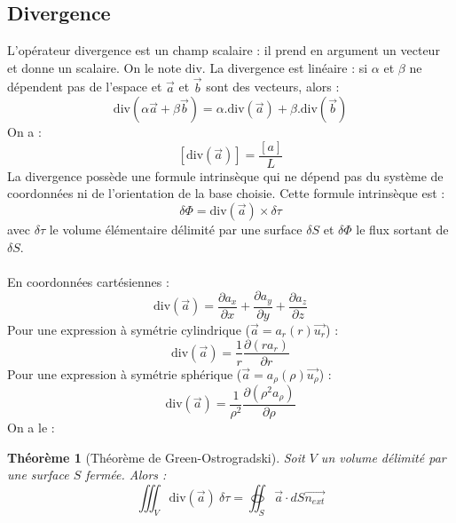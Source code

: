 \documentclass[french]{book}
\theoremstyle{plain}
\newtheorem{thm}{Théorème}
\theoremstyle{definition}
\theoremstyle{remark}
\renewcommand{\div}{\text{div}}
\begin{document}
\subsection{Divergence}
L'opérateur divergence est un champ scalaire : il prend en argument un vecteur et donne un scalaire. On le note $\div$. La divergence est linéaire : si $\alpha$ et $\beta$ ne dépendent pas de l'espace et $\overrightarrow{a}$ et $\overrightarrow{b}$ sont des vecteurs, alors : $$\div(\alpha \overrightarrow{a}+\beta\overrightarrow{b})=\alpha.\div(\overrightarrow{a})+\beta.\div(\overrightarrow{b})$$
On a : $$\left[\div(\overrightarrow{a})\right]=\frac{[a]}{L}$$ 
La divergence possède une formule intrinsèque qui ne dépend pas du système de coordonnées ni de l'orientation de la base choisie. Cette formule intrinsèque est : $$\delta\Phi =\div(\overrightarrow{a})\times\delta\tau$$ avec $\delta\tau$ le volume élémentaire délimité par une surface $\delta S$ et $\delta\Phi$ le flux sortant de $\delta S$. \\ \\
En coordonnées cartésiennes : $$\div(\overrightarrow{a})=\frac{\partial a_x}{\partial x}+\frac{\partial a_y}{\partial y}+\frac{\partial a_z}{\partial z}$$
Pour une expression à symétrie cylindrique ($\overrightarrow{a}=a_r(r)\overrightarrow{u_r}$) : $$\div(\overrightarrow{a})=\frac{1}{r}\frac{\partial(ra_r)}{\partial r}$$
Pour une expression à symétrie sphérique ($\overrightarrow{a}=a_\rho(\rho)\overrightarrow{u_\rho}$) : $$\div(\overrightarrow{a})=\frac{1}{\rho^2}\frac{\partial(\rho^2a_\rho)}{\partial \rho}$$
On a le :
\begin{thm}[Théorème de Green-Ostrogradski]
	Soit $V$ un volume délimité par une surface $S$ fermée. Alors :
	$$\iiint_V\div(\overrightarrow{a}) \ \delta\tau = \oiint_S\overrightarrow{a}\cdot dS\overrightarrow{n_{ext}} $$
\end{thm}
\end{document}
